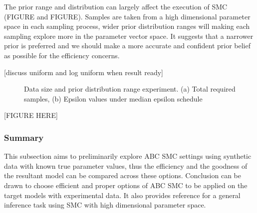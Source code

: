\documentclass[12pt,a4paper]{report}
\begin{document}
The prior range and distribution can largely affect the execution of SMC (FIGURE and FIGURE). Samples are taken from a high dimensional parameter space in each sampling process, wider prior distribution ranges will making each sampling explore more in the parameter vector space. It suggests that a narrower prior is preferred and we should make a more accurate and confident prior belief as possible for the efficiency concerns.

[discuss uniform and log uniform when result ready]

\begin{figure}
    \begin{center}
    \end{center}
    
    \caption[Data size and prior distribution range experiment]%
        {Data size and prior distribution range experiment. (a) Total required samples, (b) Epsilon values under median epsilon schedule}
    \label{fig:size}
    
\end{figure}

[FIGURE HERE]


\subsubsection{Summary} This subsection aims to preliminarily explore ABC SMC settings using synthetic data with known true parameter values, thus the efficiency and the goodness of the resultant model can be compared across these options. Conclusion can be drawn to choose efficient and proper options of ABC SMC to be applied on the target models with experimental data. It also provides reference for a general inference task using SMC with high dimensional parameter space.
\end{document}
